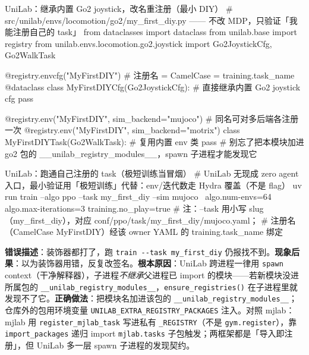 \begin{codebox}[Python]{UniLab：继承内置 Go2 joystick，改名重注册（最小 DIY）}
# src/unilab/envs/locomotion/go2/my_first_diy.py —— 不改 MDP，只验证「我能注册自己的 task」
from dataclasses import dataclass
from unilab.base import registry
from unilab.envs.locomotion.go2.joystick import Go2JoystickCfg, Go2WalkTask

@registry.envcfg("MyFirstDIY")                       # 注册名 = CamelCase = training.task_name
@dataclass
class MyFirstDIYCfg(Go2JoystickCfg):                 # 直接继承内置 Go2 joystick cfg
    pass

@registry.env("MyFirstDIY", sim_backend="mujoco")    # 同名可对多后端各注册一次
@registry.env("MyFirstDIY", sim_backend="motrix")
class MyFirstDIYTask(Go2WalkTask):                    # 复用内置 env 类
    pass
# 别忘了把本模块加进 go2 包的 __unilab_registry_modules__，spawn 子进程才能发现它
\end{codebox}

\begin{codebox}[bash]{UniLab：跑通自己注册的 task（极短训练当冒烟）}
# UniLab 无现成 zero agent 入口，最小验证用「极短训练」代替：env/迭代数走 Hydra 覆盖（不是 flag）
uv run train --algo ppo --task my_first_diy --sim mujoco \
    algo.num-envs=64 algo.max-iterations=3 training.no_play=true
# 注：--task 用小写 slug（my_first_diy），对应 conf/ppo/task/my_first_diy/mujoco.yaml；
#     注册名（CamelCase MyFirstDIY）经该 owner YAML 的 training.task_name 绑定
\end{codebox}

\begin{pitfall}
\textbf{错误描述}：装饰器都打了，跑 \verb|train --task my_first_diy| 仍报找不到。\textbf{现象后果}：以为装饰器用错，反复改签名。\textbf{根本原因}：UniLab 跨进程一律用 \verb|spawn| context（干净解释器），子进程\emph{不继承}父进程已 import 的模块——若新模块没进所属包的 \verb|__unilab_registry_modules__|，\verb|ensure_registries()| 在子进程里就发现不了它。\textbf{正确做法}：把模块名加进该包的 \verb|__unilab_registry_modules__|；仓库外的包用环境变量 \verb|UNILAB_EXTRA_REGISTRY_PACKAGES| 注入。对照 mjlab：mjlab 用 \verb|register_mjlab_task| 写进私有 \verb|_REGISTRY|（不是 \verb|gym.register|），靠 \verb|import_packages| 递归 import \verb|mjlab.tasks| 子包触发；两框架都是「导入即注册」，但 UniLab 多一层 spawn 子进程的发现契约。
\end{pitfall}

